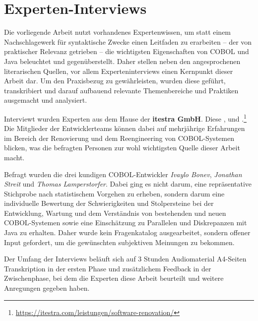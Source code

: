 \section{Experten-Interviews}\label{interviews}
Die vorliegende Arbeit nutzt vorhandenes Expertenwissen, um statt einem Nachschlagewerk für syntaktische Zwecke einen Leitfaden zu erarbeiten -- der von praktischer Relevanz getrieben -- die wichtigsten Eigenschaften von COBOL und Java beleuchtet und gegenüberstellt. Daher stellen neben den angesprochenen literarischen Quellen, vor allem Experteninterviews einen Kernpunkt dieser Arbeit dar. Um den Praxisbezug zu gewährleisten, wurden diese geführt, transkribiert und darauf aufbauend relevante Themenbereiche und Praktiken ausgemacht und analysiert.

Interviewt wurden Experten aus dem Hause der \textbf{itestra GmbH}. Diese ,  und .\footnote{\label{itestraFootnote}\url{https://itestra.com/leistungen/software-renovation/}} Die Mitglieder der Entwicklerteams können dabei auf mehrjährige Erfahrungen im Bereich der Renovierung und dem Reengineering von COBOL-Systemen blicken, was die befragten Personen zur wohl wichtigsten Quelle dieser Arbeit macht.

Befragt wurden die drei kundigen COBOL-Entwickler \textit{Ivaylo Bonev}, \textit{Jonathan Streit} und \textit{Thomas Lamperstorfer}. Dabei ging es nicht darum, eine repräsentative Stichprobe nach statistischem Vorgehen zu erheben, sondern darum eine individuelle Bewertung der Schwierigkeiten und Stolpersteine bei der Entwicklung, Wartung und dem Verständnis von bestehenden und neuen COBOL-Systemen sowie eine Einschätzung zu Parallelen und Diskrepanzen mit Java zu erhalten. Daher wurde kein Fragenkatalog ausgearbeitet, sondern offener Input gefordert, um die gewünschten subjektiven Meinungen zu bekommen. 

Der Umfang der Interviews beläuft sich auf 3 Stunden Audiomaterial  A4-Seiten Transkription in der ersten Phase und zusätzlichem Feedback in der Zwischenphase, bei dem die Experten diese Arbeit beurteilt und weitere Anregungen gegeben haben.